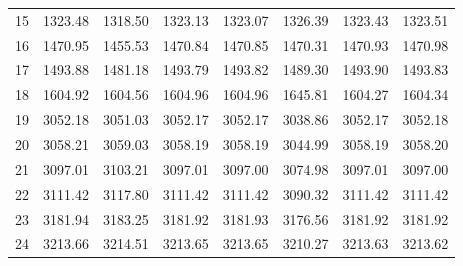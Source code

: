 \documentclass[10pt,oneside]{article}
\begin{document}
\begin{table}[h!]
\begin{tabular}{cccccccc}
15 &   1323.48 & 1318.50 & 1323.13 &    1323.07 &      1326.39 & 1323.43 &   1323.51 \\
16 &   1470.95 & 1455.53 & 1470.84 &    1470.85 &      1470.31 & 1470.93 &   1470.98 \\
17 &   1493.88 & 1481.18 & 1493.79 &    1493.82 &      1489.30 & 1493.90 &   1493.83 \\
18 &   1604.92 & 1604.56 & 1604.96 &    1604.96 &      1645.81 & 1604.27 &   1604.34 \\
19 &   3052.18 & 3051.03 & 3052.17 &    3052.17 &      3038.86 & 3052.17 &   3052.18 \\
20 &   3058.21 & 3059.03 & 3058.19 &    3058.19 &      3044.99 & 3058.19 &   3058.20 \\
21 &   3097.01 & 3103.21 & 3097.01 &    3097.00 &      3074.98 & 3097.01 &   3097.00 \\
22 &   3111.42 & 3117.80 & 3111.42 &    3111.42 &      3090.32 & 3111.42 &   3111.42 \\
23 &   3181.94 & 3183.25 & 3181.92 &    3181.93 &      3176.56 & 3181.92 &   3181.92 \\
24 &   3213.66 & 3214.51 & 3213.65 &    3213.65 &      3210.27 & 3213.63 &   3213.62 \\
\bottomrule
\end{tabular}
\end{table}
\end{document}
